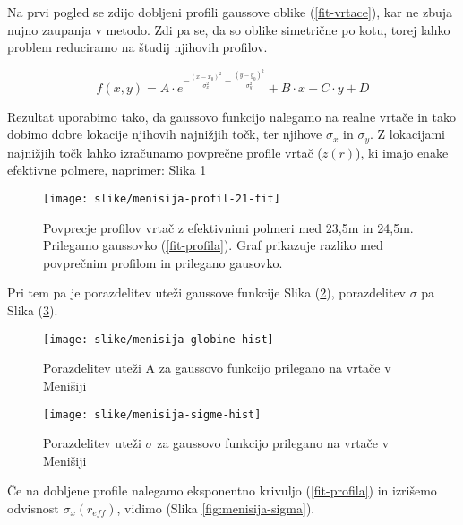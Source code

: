 \documentclass[a4paper, oneside, 12pt]{book}
\begin{document}
  Na prvi pogled se zdijo dobljeni profili gaussove oblike (\ref{fit-vrtace}), kar ne zbuja nujno zaupanja v metodo. Zdi pa se, da so oblike simetrične po kotu, torej lahko problem reduciramo na študij njihovih profilov. 

  \begin{equation}
    f(x,y) = A \cdot e^{-\frac{(x-x_0)^2}{\sigma_x^2}-\frac{(y-y_0)^2}{\sigma_y^2}} + B \cdot x + C \cdot y + D  
    \label{fit-vrtace}
  \end{equation}

  Rezultat uporabimo tako, da gaussovo funkcijo nalegamo na realne vrtače in tako dobimo dobre lokacije njihovih najnižjih točk, ter njihove $\sigma_x$ in $\sigma_y$. Z lokacijami najnižjih točk lahko izračunamo povprečne profile vrtač ($z(r)$), ki imajo enake efektivne polmere, naprimer: Slika \ref{fig:menisija-profil-21-fit}

  \begin{figure}[H]
    \centering
    \texttt{[image: slike/menisija-profil-21-fit]}
    \caption{Povprecje profilov vrtač z efektivnimi polmeri med 23,5m in 24,5m. Prilegamo gaussovko (\ref{fit-profila}). Graf prikazuje razliko med povprečnim profilom in prilegano gausovko.}
    \label{fig:menisija-profil-21-fit}
  \end{figure}

  Pri tem pa je porazdelitev uteži gaussove funkcije Slika (\ref{fig:menisija-globine-hist}), porazdelitev $\sigma$ pa Slika (\ref{fig:menisija-sigme-hist}).

  \begin{figure}[H]
    \begin{center}
      \texttt{[image: slike/menisija-globine-hist]}
    \end{center}
    \caption{Porazdelitev uteži A za gaussovo funkcijo prilegano na vrtače v Menišiji}
    \label{fig:menisija-globine-hist}
  \end{figure}

  \begin{figure}[H]
    \begin{center}
      \texttt{[image: slike/menisija-sigme-hist]}
    \end{center}
    \caption{Porazdelitev uteži $\sigma$ za gaussovo funkcijo prilegano na vrtače v Menišiji}
    \label{fig:menisija-sigme-hist}
  \end{figure}

  Če na dobljene profile nalegamo eksponentno krivuljo (\ref{fit-profila}) in izrišemo odvisnost $\sigma_x (r_{eff})$, vidimo (Slika \ref{fig:menisija-sigma}).
\end{document}
